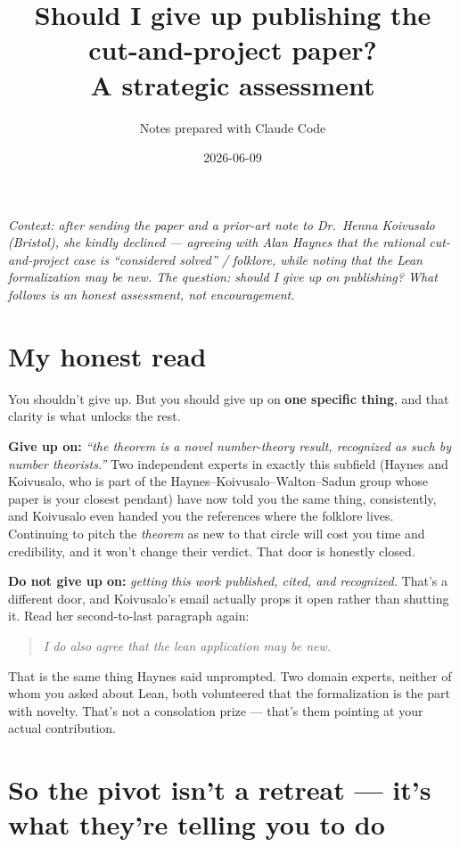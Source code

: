 \documentclass[11pt,a4paper]{article}
\title{Should I give up publishing the cut-and-project paper?\\[4pt]
       \large A strategic assessment}
\author{Notes prepared with Claude Code}
\date{2026-06-09}
\newenvironment{quotebox}
  {\begin{quote}\itshape\color{black!70}}
  {\end{quote}}
\begin{document}
\maketitle

\noindent
\textit{Context: after sending the paper and a prior-art note to Dr.\ Henna
Koivusalo (Bristol), she kindly declined --- agreeing with Alan Haynes that
the rational cut-and-project case is ``considered solved'' / folklore, while
noting that the Lean formalization may be new. The question: should I give up
on publishing? What follows is an honest assessment, not encouragement.}

\section*{My honest read}

You shouldn't give up. But you should give up on \textbf{one specific thing},
and that clarity is what unlocks the rest.

\textbf{Give up on:} \emph{``the theorem is a novel number-theory result,
recognized as such by number theorists.''} Two independent experts in exactly
this subfield (Haynes and Koivusalo, who is part of the
Haynes--Koivusalo--Walton--Sadun group whose paper is your closest pendant)
have now told you the same thing, consistently, and Koivusalo even handed you
the references where the folklore lives. Continuing to pitch the \emph{theorem}
as new to that circle will cost you time and credibility, and it won't change
their verdict. That door is honestly closed.

\textbf{Do not give up on:} \emph{getting this work published, cited, and
recognized.} That's a different door, and Koivusalo's email actually props it
open rather than shutting it. Read her second-to-last paragraph again:

\begin{quotebox}
I do also agree that the lean application may be new.
\end{quotebox}

That is the same thing Haynes said unprompted. Two domain experts, neither of
whom you asked about Lean, both volunteered that the formalization is the part
with novelty. That's not a consolation prize --- that's them pointing at your
actual contribution.

\section*{So the pivot isn't a retreat --- it's what they're telling you to do}
\end{document}
